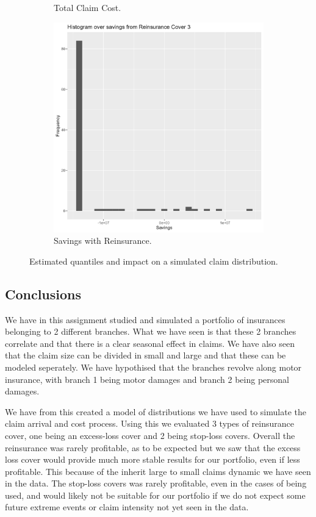 \documentclass[11pt]{article}
\begin{document}
\begin{figure}[!h]
\begin{subfigure}{.32\textwidth}
      \caption{Total Claim Cost.}
    \end{subfigure}
    \begin{subfigure}{.32\textwidth}
      \centering
      \includegraphics[width=.9\linewidth]{plots/reinsurance3/histogram_savings.png}
      \caption{Savings with Reinsurance.}
    \end{subfigure}
    \caption{Estimated quantiles and impact on a simulated claim distribution.}
    \label{a7:claim_cost}
\end{figure}

\subsection*{Conclusions}
We have in this assignment studied and simulated a portfolio of insurances belonging to 2 different branches.
What we have seen is that these 2 branches correlate and that there is a clear seasonal effect in claims.
We have also seen that the claim size can be divided in small and large and that these can be modeled seperately.
We have hypothised that the branches revolve along motor insurance, with branch 1 being motor damages and branch 2 being personal damages.

We have from this created a model of distributions we have used to simulate the claim arrival and cost process.
Using this we evaluated 3 types of reinsurance cover, one being an excess-loss cover and 2 being stop-loss covers.
Overall the reinsurance was rarely profitable, as to be expected but we saw that the excess loss cover would provide much more stable results for our portfolio, even if less profitable.
This because of the inherit large to small claims dynamic we have seen in the data.
The stop-loss covers was rarely profitable, even in the cases of being used, and would likely not be suitable for our portfolio if we do not expect some future extreme events or claim intensity not yet seen in the data.
\end{document}
